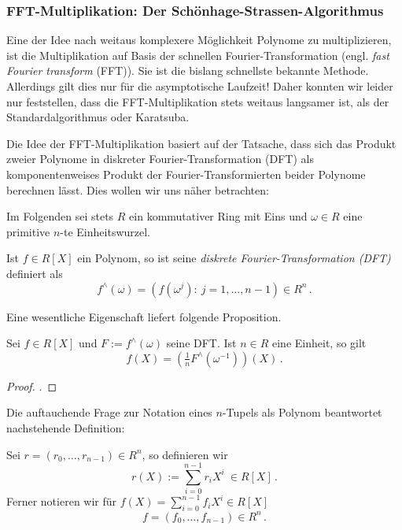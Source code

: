 \subsubsection{FFT-Multiplikation: Der Schönhage-Strassen-Algorithmus}
Eine der Idee nach weitaus komplexere Möglichkeit Polynome zu
multiplizieren, ist die Multiplikation auf Basis der schnellen
Fourier-Transformation (engl. \emph{fast Fourier transform} (FFT)). 
Sie ist die bislang schnellste
bekannte Methode. Allerdings gilt dies nur für die asymptotische Laufzeit!
Daher konnten wir leider nur feststellen, dass die FFT-Multiplikation stets
weitaus langsamer ist, als der Standardalgorithmus oder Karatsuba.

Die Idee der FFT-Multiplikation basiert auf der Tatsache, dass sich das Produkt
zweier Polynome in diskreter Fourier-Transformation (DFT) als komponentenweises
Produkt der Fourier-Transformierten beider Polynome berechnen lässt. 
Dies wollen wir uns näher betrachten:

Im Folgenden sei stets $R$ ein kommutativer Ring mit Eins und 
$\omega\in R$ eine primitive $n$-te Einheitswurzel.

\begin{definition}
   Ist $f\in R[X]$ ein Polynom, so ist seine
  \emph{diskrete Fourier-Transformation (DFT)} definiert als
  \[ f^\wedge(\omega) = (f(\omega^j):\ j=1,\ldots,n-1) \in R^n\,.\]
\end{definition}

Eine wesentliche Eigenschaft liefert folgende Proposition. 

\begin{prop}
  Sei $f \in R[X]$ und $F := f^\wedge(\omega)$ seine DFT. Ist 
  $n \in R$ eine Einheit, so gilt
  \[ f(X) = (\tfrac 1 n F^\wedge(\omega^{-1}))(X) \,.\]
\end{prop}
\begin{proof}
  \autocite[Proposition 4.9]{fft}. 
\end{proof}

Die auftauchende Frage zur Notation eines $n$-Tupels als Polynom beantwortet
nachstehende Definition:

\begin{definition}
  Sei $r = (r_0,\ldots,r_{n-1})\in R^n$, so definieren wir 
  \[ r(X) := \sum_{i=0}^{n-1} r_i X^i \ \in R[X] \,.\]
  Ferner notieren wir für 
  $f(X) = \sum_{i=0}^{n-1} f_i X^i \in R[X]$
  \[ f = (f_0,\ldots,f_{n-1}) \in R^n \,.\]
\end{definition}


